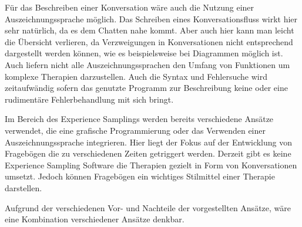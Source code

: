 Für das Beschreiben einer Konversation wäre auch die Nutzung einer Auszeichnungssprache möglich. Das Schreiben eines Konversationsfluss wirkt hier sehr natürlich, da es dem Chatten nahe kommt. Aber auch hier kann man leicht die Übersicht verlieren, da Verzweigungen in Konversationen nicht entsprechend dargestellt werden können, wie es beispielsweise bei Diagrammen möglich ist. Auch liefern nicht alle Auszeichnungssprachen den Umfang von Funktionen um komplexe Therapien darzustellen. Auch die Syntax und Fehlersuche wird zeitaufwändig sofern das genutzte Programm zur Beschreibung keine oder eine rudimentäre Fehlerbehandlung mit sich bringt.  

Im Bereich des Experience Samplings werden bereits verschiedene Ansätze verwendet, die eine grafische Programmierung oder das Verwenden einer Auszeichnungssprache integrieren. Hier liegt der Fokus auf der Entwicklung von Fragebögen die zu verschiedenen Zeiten getriggert werden. Derzeit gibt es keine Experience Sampling Software die Therapien gezielt in Form von Konversationen umsetzt. Jedoch können Fragebögen ein wichtiges Stilmittel einer Therapie darstellen. 

Aufgrund der verschiedenen Vor- und Nachteile der vorgestellten Ansätze, wäre eine Kombination verschiedener Ansätze denkbar. 
